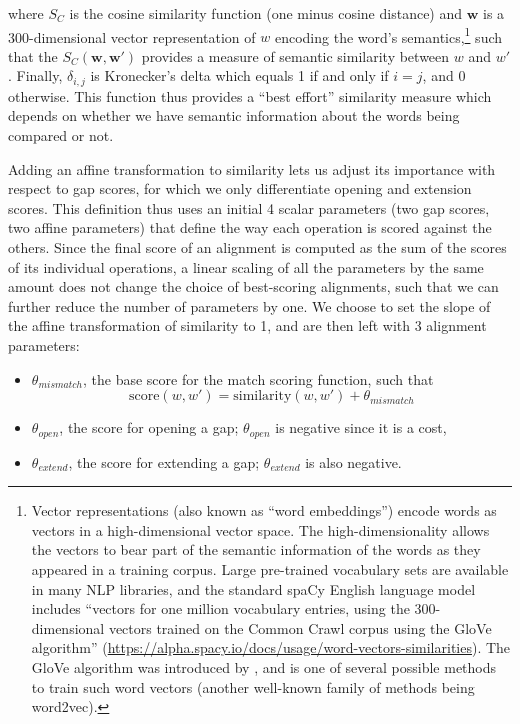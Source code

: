 \documentclass[a4paper,fleqn]{cas-dc}
\begin{document}
where \(S_C\) is the cosine similarity function (one minus cosine
distance) and \(\bm{w}\) is a 300-dimensional vector representation of
\(w\) encoding the word's semantics,\footnote{Vector representations
  (also known as \enquote{word embeddings}) encode words as vectors in a
  high-dimensional vector space. The high-dimensionality allows the
  vectors to bear part of the semantic information of the words as they
  appeared in a training corpus. Large pre-trained vocabulary sets are
  available in many NLP libraries, and the standard spaCy English
  language model includes \enquote{vectors for one million vocabulary
  entries, using the 300-dimensional vectors trained on the Common Crawl
  corpus using the GloVe algorithm}
  (\url{https://alpha.spacy.io/docs/usage/word-vectors-similarities}).
  The GloVe algorithm was introduced by
  \citet{pennington_glove:_2014}, and is one of several possible
  methods to train such word vectors (another well-known family of
  methods being word2vec).} such that the \(S_C(\bm{w}, \bm{w}')\)
provides a measure of semantic similarity between \(w\) and \(w'\).
Finally, \(\delta_{i,j}\) is Kronecker's delta which equals 1 if and
only if \(i = j\), and 0 otherwise. This function thus provides a
\enquote{best effort} similarity measure which depends on whether we
have semantic information about the words being compared or not.

Adding an affine transformation to similarity lets us adjust its
importance with respect to gap scores, for which we only differentiate
opening and extension scores. This definition thus uses an initial 4
scalar parameters (two gap scores, two affine parameters) that define
the way each operation is scored against the others. Since the final
score of an alignment is computed as the sum of the scores of its
individual operations, a linear scaling of all the parameters by the
same amount does not change the choice of best-scoring alignments, such
that we can further reduce the number of parameters by one. We choose to
set the slope of the affine transformation of similarity to 1, and are
then left with 3 alignment parameters:

\begin{itemize}
\item
  \(\theta_{mismatch}\), the base score for the match scoring function,
  such that
  \[\text{score}(w, w') = \text{similarity}(w, w') + \theta_{mismatch}\]
\item
  \(\theta_{open}\), the score for opening a gap; \(\theta_{open}\) is
  negative since it is a cost,
\item
  \(\theta_{extend}\), the score for extending a gap;
  \(\theta_{extend}\) is also negative.
\end{itemize}
\end{document}
